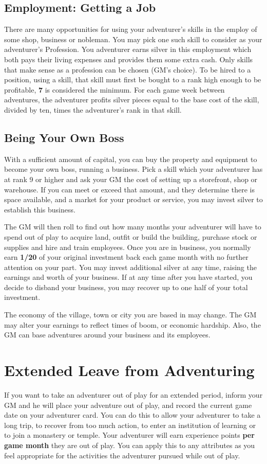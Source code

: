 \begin{multicols*}{2}
\subsection{Employment: Getting a Job}
There are many opportunities for using your adventurer's skills in the employ of some shop, business or nobleman. You may pick one such skill to consider as your adventurer's Profession. You adventurer earns silver in this employment which both pays their living expenses and provides them some extra cash. Only skills that make sense as a profession can be chosen (GM's choice). To be hired to a position, using a skill, that skill must first be bought to a rank high enough to be profitable, \textbf{7} is considered the minimum. For each game week between adventures, the adventurer profits silver pieces equal to the base cost of the skill, divided by ten, times the adventurer's rank in that skill.
\subsection{Being Your Own Boss}
With a sufficient amount of capital, you can buy the property and equipment to become your own boss, running a business. Pick a skill which your adventurer has at rank 9 or higher and ask your GM the cost of setting up a storefront, shop or warehouse. If you can meet or exceed that amount, and they determine there is space available, and a market for your product or service, you may invest silver to establish this business.

The GM will then roll  to find out how many months your adventurer will have to spend out of play to acquire land, outfit or build the building, purchase stock or supplies and hire and train employees. Once you are in business, you normally earn \textbf{1/20} of your original investment back each game month with no further attention on your part. You may invest additional silver at any time, raising the earnings and worth of your business. If at any time after you have started, you decide to disband your business, you may recover up to one half of your total investment.

The economy of the village, town or city you are based in may change. The GM may alter your earnings to reflect times of boom, or economic hardship. Also, the GM can base adventures around your business and its employees.
\section{Extended Leave from Adventuring}
If you want to take an adventurer out of play for an extended period, inform your GM and he will place your adventure out of play, and record the current game date on your adventurer card. You can do this to allow your adventurer to take a long trip, to recover from too much action, to enter an institution of learning or to join a monastery or temple. Your adventurer will earn  experience points \textbf{per game month} they are out of play. You can apply this to any attributes as you feel appropriate for the activities the adventurer pursued while out of play. 


\end{multicols*}
